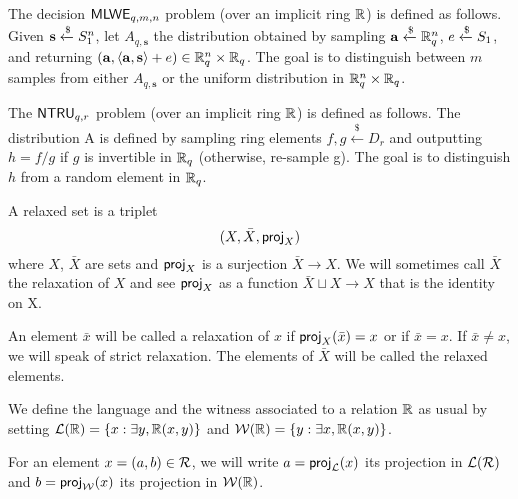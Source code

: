 \begin{definition}
	The decision $\mathsf{MLWE}_{q, m, n}$ problem (over an implicit ring $\mathbb{R}$) is defined as
	follows. Given $\mathbf{s}  \xleftarrow{\$} S_{1}^n$, let $A_{q,\mathbf{s}}$ the distribution
	obtained by sampling $\mathbf{a} \xleftarrow{\$} \mathbb{R}^n_q$, $e \xleftarrow{\$} S_{1}$,
	and returning $(\mathbf{a}, \left<\mathbf{a},\mathbf{s}\right> + e) \in \mathbb{R}^n_q \times
		\mathbb{R}_q$. The goal is to distinguish between $m$ samples from either $A_{q,
				\mathbf{s}}$ or the uniform distribution in $\mathbb{R}^n_q\times \mathbb{R}_q$.
\end{definition}

\begin{definition}
	The $\mathsf{NTRU}_{q,r}$ problem (over an implicit ring $\mathbb{R}$) is defined as
	follows.  The distribution A is defined by sampling ring elements $f, g \xleftarrow{\$} D_r$
	and outputting $h = f/g$ if $g$ is invertible in $\mathbb{R}_q$ (otherwise, re-sample g).
	The goal is to distinguish $h$ from a random element in $\mathbb{R}_q$.
\end{definition}


	A relaxed set is a triplet
\begin{equation*}(X,\bar{X}, \projX)\end{equation*}
        where $X$, $\bar{X}$ are sets and $\projX$
	is a surjection $\bar{X} \rightarrow X$. We will sometimes call $\bar{X}$ the relaxation of
	$X$ and see $\projX$ as a function $\bar{X} \sqcup X \rightarrow X$ that is
	the identity on X.

	An element $\bar{x}$ will be called a relaxation of $x$ if 
$\projX(\bar{x}) = x$ or if
	$\bar{x} = x$. If $\bar{x} \neq x$, we will speak of 
strict relaxation.
	The elements of $\bar{X}$ will be called the relaxed elements.


	We define the language and the witness associated to a relation $\mathbb{R}$ as usual by setting
	$\mathcal{L}(\mathbb{R}) = \{ x : \exists y, \mathbb{R}(x, y)\}$ and $\mathcal{W}(\mathbb{R}) = \{ y : \exists x, \mathbb{R}(x, y)\}$.

	For an element $x = (a,b) \in \mathcal{R}$, we will write $a=\projL(x)$ its projection in
	$\mathcal{L}(\mathcal{R})$ and $b=\projW(x)$ its projection in $\mathcal{W}(\mathbb{R})$.


